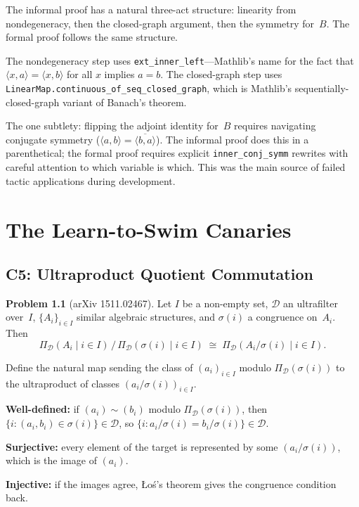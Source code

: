 \documentclass[12pt,oneside]{book}
\theoremstyle{plain}
\theoremstyle{definition}
\newtheorem{problem}{Problem}[chapter]
\theoremstyle{remark}
\begin{document}
\begin{notebox}
The informal proof has a natural three-act structure: linearity from
nondegeneracy, then the closed-graph argument, then the symmetry for~$B$.
The formal proof follows the same structure.

The nondegeneracy step uses \texttt{ext\_inner\_left}---Mathlib's name
for the fact that $\langle x, a \rangle = \langle x, b \rangle$ for all
$x$ implies $a = b$. The closed-graph step uses
\texttt{LinearMap.continuous\_of\_seq\_closed\_graph}, which is Mathlib's
sequentially-closed-graph variant of Banach's theorem.

The one subtlety: flipping the adjoint identity for~$B$ requires
navigating conjugate symmetry ($\langle a, b \rangle = \overline{\langle
b, a \rangle}$). The informal proof does this in a parenthetical; the
formal proof requires explicit \texttt{inner\_conj\_symm} rewrites with
careful attention to which variable is which. This was the main source
of failed tactic applications during development.
\end{notebox}

\part{The Learn-to-Swim Canaries}

\chapter{C5: Ultraproduct Quotient Commutation}\label{ch:c5}

\begin{problem}[arXiv 1511.02467]
Let $I$ be a non-empty set, $\mathcal{D}$ an ultrafilter over~$I$,
$\{A_i\}_{i \in I}$ similar algebraic structures, and $\sigma(i)$ a
congruence on~$A_i$. Then
\[
  \Pi_{\mathcal{D}}(A_i \mid i \in I) \,/\, \Pi_{\mathcal{D}}(\sigma(i) \mid i \in I)
  \;\cong\;
  \Pi_{\mathcal{D}}(A_i/\sigma(i) \mid i \in I).
\]
\end{problem}

\begin{proofbox}
Define the natural map sending the class of $(a_i)_{i \in I}$ modulo
$\Pi_{\mathcal{D}}(\sigma(i))$ to the ultraproduct of classes
$(a_i/\sigma(i))_{i \in I}$.

\textbf{Well-defined:} if $(a_i) \sim (b_i)$ modulo $\Pi_{\mathcal{D}}(\sigma(i))$,
then $\{i : (a_i, b_i) \in \sigma(i)\} \in \mathcal{D}$, so
$\{i : a_i/\sigma(i) = b_i/\sigma(i)\} \in \mathcal{D}$.

\textbf{Surjective:} every element of the target is represented by some
$(a_i/\sigma(i))$, which is the image of $(a_i)$.

\textbf{Injective:} if the images agree, {\L}o\'s's theorem gives the
congruence condition back.
\end{proofbox}
\end{document}

